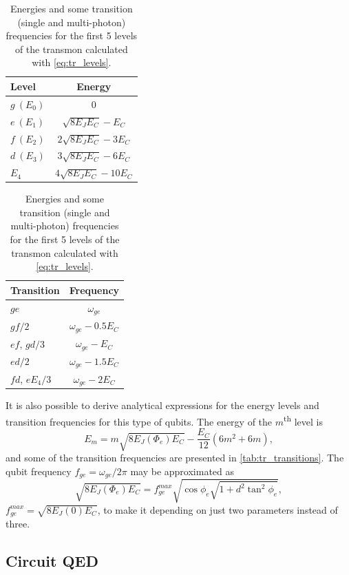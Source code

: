 \documentclass[%
 aip,
 amsmath,amssymb,
 reprint,%
]{revtex4-1}
\begin{document}
\begin{table}
\centering
\begin{tabular}{l|c}
Level & Energy\\
\hline
$g\ (E_0)$ & 0\\
$e\ (E_1)$ & $\sqrt{8E_J E_C} - E_C$\\
$f\ (E_2)$ & $2\sqrt{8E_J E_C} - 3 E_C$\\
$d\ (E_3)$ & $3\sqrt{8E_J E_C} - 6 E_C$\\
$E_4$ & $4\sqrt{8E_J E_C} - 10 E_C$\\
\hline
\end{tabular}\quad
\begin{tabular}{l|c}
Transition & Frequency\\
\hline
$ge$ & $\omega_{ge}$ \\
$gf/2$ & $\omega_{ge} - 0.5 E_C$\\
$ef$, $gd/3$& $\omega_{ge}-E_C$\\
$ed/2$ & $\omega_{ge} - 1.5 E_C$\\
$fd$, $e E_4/3$ & $\omega_{ge}-2 E_C$\\
\hline
\end{tabular}
\caption{Energies and some transition (single and multi-photon) frequencies for the first 5 levels of the transmon calculated with \eqref{eq:tr_levels}.}
\label{tab:tr_transitions}
\end{table}
It is also possible to derive analytical expressions for the energy levels and transition frequencies for this type of qubits. The energy of the $m$\textsuperscript{th} level is \cite{koch2007}
\begin{equation}
E_m = m \sqrt{8E_J(\Phi_e) E_C} -\frac{E_C}{12}(6m^2+6m),
\label{eq:tr_levels}
\end{equation}
and some of the transition frequencies are presented in \autoref{tab:tr_transitions}. The qubit frequency $f_{ge} = \omega_{ge}/2\pi$ may be approximated as $$\sqrt{8 E_J (\Phi_e) E_C} = f_{ge}^{max} \sqrt{\cos\phi_e \sqrt{1+d^2 \tan^2\phi_e}},$$
$f_{ge}^{max} = \sqrt{8 E_J(0) E_C}$, to make it depending on just two parameters instead of three.


\subsection{Circuit QED}
\end{document}

